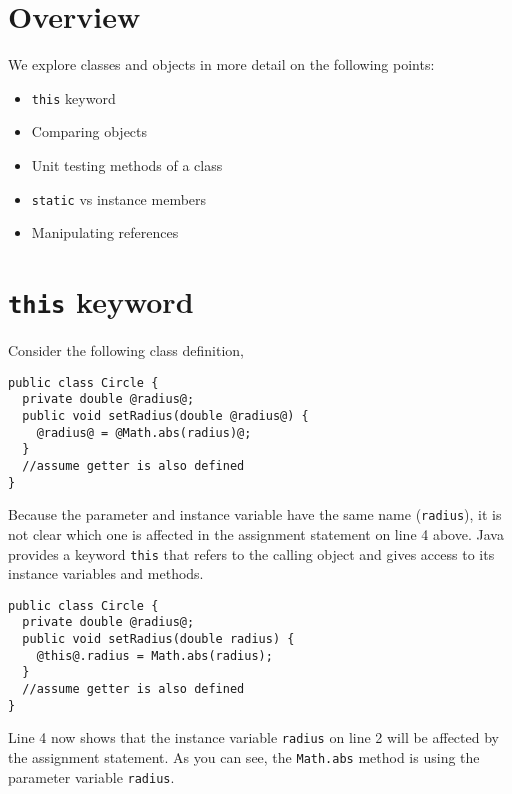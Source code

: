 \def\topic{Classes and Objects - 2}


\section{Overview}
    We explore classes and objects in more detail on the following points:
    
    \begin{itemize}
    \item \texttt{this} keyword
    \item Comparing objects
    \item Unit testing methods of a class
    \item \texttt{static} vs instance members
    \item Manipulating references
    \end{itemize}
 
 
\section{\texttt{this} keyword}
  Consider the following class definition,
 
\begin{lstlisting}[frame=single,style=buggy]
public class Circle {
  private double @radius@;
  public void setRadius(double @radius@) {
    @radius@ = @Math.abs(radius)@;
  }
  //assume getter is also defined
}
\end{lstlisting}  

Because the parameter and instance variable have the same name (\texttt{radius}), it is not clear which one is affected in the assignment statement on line 4 above.
\vskip 0.5cm
Java provides a keyword \texttt{this} that refers to the calling object and gives access to its instance variables and methods. 
  \begin{lstlisting}[frame=single,style=correct]
public class Circle {
  private double @radius@;
  public void setRadius(double radius) {
    @this@.radius = Math.abs(radius);
  }
  //assume getter is also defined
}
  \end{lstlisting}  
  Line 4 now shows that the instance variable \texttt{radius} on line 2 will be affected by the assignment statement. As you can see, the \texttt{Math.abs} method  is using the parameter variable \texttt{radius}.

